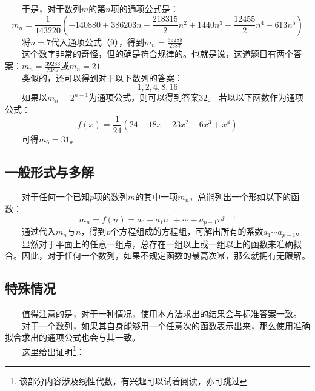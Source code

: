 \documentclass[12pt]{article}
\begin{document}
        　　于是，对于数列$m$的第$n$项的通项公式是：\\
        \begin{equation}
          m_{n}=\frac{1}{143220}(-140880+386203n-\frac{218315}{2}n^{2}+1440n^{3}+\frac{12455}{2}n^{4}-613n^{5})
        \end{equation}
        　　将$n=7$代入通项公式（9），得到$m_{n}=\frac{39288}{2387}$\\
        　　这个数字非常的奇怪，但的确是符合规律的。也就是说，这道题目有两个答案：$m_{n}=\frac{39288}{2387}$或$m_{n}=21$\\
        　　类似的，还可以得到对于以下数列的答案：
        \begin{equation}
          1, 2, 4, 8, 16
        \end{equation}
        　　如果以$m_{n}=2^{n-1}$为通项公式，则可以得到答案$32$。
        若以以下函数作为通项公式：
        \begin{equation}
          f(x)=\frac{1}{24}(24-18x+23x^{2}-6x^{3}+x^{4})
        \end{equation}
        　　可得$m_{6}=31$。
      \subsection{一般形式与多解}
        　　对于任何一个已知$p$项的数列$m$的其中一项$m_{n}$，总能列出一个形如以下的函数：
        \begin{equation}
          m_{n}=f(n)=a_{0}+a_{1}n^{1}+\cdots+a_{p-1}n^{p-1}
        \end{equation}
        　　通过代入$m_{n}$与$n$，得到$p$个方程组成的方程组，可解出所有的系数$a_{1}\cdots{}a_{p-1}$。\\
        　　显然对于平面上的任意一组点，总存在一组以上或一组以上的函数来准确拟合。因此，对于任何一个数列，如果不规定函数的最高次幂，那么就拥有无限解。
      \subsection{特殊情况}
        　　值得注意的是，对于一种情况，使用本方法求出的结果会与标准答案一致。\\
        　　对于一个数列，如果其自身能够用一个任意次的函数表示出来，那么使用准确拟合求出的通项公式也会与其一致。\\
        　　这里给出证明\footnote{该部分内容涉及线性代数，有兴趣可以试着阅读，亦可跳过}：\\
\end{document}
